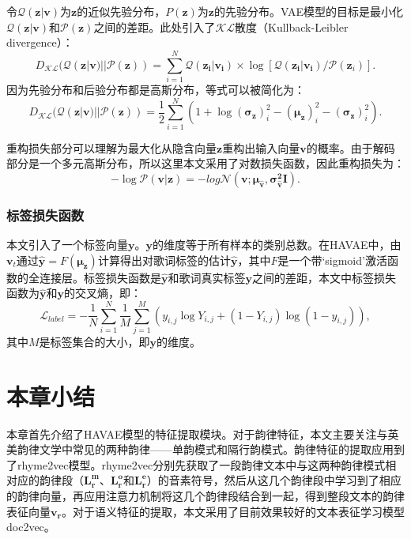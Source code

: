 令$ \mathcal Q( \bm z|\bm v)$为$ \bm z $的近似先验分布，$ P\left(\bm z\right) $为$ \bm z $的先验分布。VAE模型的目标是最小化$\mathcal Q (\bm z|\bm{v})$和$\mathcal P\left(\bm z\right) $之间的差距。此处引入了$\mathcal{KL}$散度（Kullback-Leibler divergence）：
\begin{equation}
    D_{\mathcal{KL}}(\mathcal{Q}(\bm z|\bm v)||\mathcal{P}(\bm z))=\sum _{i=1}^{N}\mathcal{Q}(\bm {z_i}|\bm {v_i}) \times \log { [{\mathcal{Q}(\bm {z_i}|\bm {v_i})}/{\mathcal P\left(\bm z_i\right)}]}.
\end{equation}
因为先验分布和后验分布都是高斯分布，等式可以被简化为：
\begin{equation}
    D_{\mathcal{KL}}(\mathcal{Q}(\bm z|\bm v)||\mathcal{P}(\bm z))=\frac{1}{2}\sum_{i=1}^{N}(1+\log(\bm{\sigma_z})_i^2-(\bm{\mu_z})_i^2-(\bm{\sigma_z})_i^2).
\end{equation}
\par

重构损失部分可以理解为最大化从隐含向量$\bm z$重构出输入向量$\bm v$的概率。由于解码部分是一个多元高斯分布，所以这里本文采用了对数损失函数，因此重构损失为：
\begin{equation}
    -\log\mathcal{P}(\bm v|\bm z)=-log\mathcal{N}(\bm v; \bm{\mu_{\hat{v}}}, \bm{\sigma_{\hat{v}}^2I}).
\end{equation}
\par

\subsubsection{标签损失函数}
本文引入了一个标签向量$\bm y$。$\bm y$的维度等于所有样本的类别总数。在HAVAE中，由$\bm v_t$通过$\bm {\hat{y}} = F(\bm{\mu_z})$计算得出对歌词标签的估计$\bm {\hat{y}}$，其中$F$是一个带‘sigmoid’激活函数的全连接层。标签损失函数是$\bm {\hat y}$和歌词真实标签$\bm y$之间的差距，本文中标签损失函数为$\bm {\hat y}$和$\bm y$的交叉熵，即：
\begin{equation}
  \mathcal{L}_{label}=-\frac{1}{N}{\sum_{i=1}^N}\frac{1}{M}{\sum_{j=1}^{M}}(y_{i,j}{\log {Y}_{i,j} }+(1-Y_{i,j})\log(1-y_{i,j})),
\end{equation}
其中$M$是标签集合的大小，即$\bm y$的维度。
\par

\section{本章小结}
本章首先介绍了HAVAE模型的特征提取模块。对于韵律特征，本文主要关注与英美韵律文学中常见的两种韵律——单韵模式和隔行韵模式。韵律特征的提取应用到了rhyme2vec模型。rhyme2vec分别先获取了一段韵律文本中与这两种韵律模式相对应的韵律段（$\bm {L_r^m}$、$\bm {L_r^o}$和$\bm {L_r^e}$）的音素符号，然后从这几个韵律段中学习到了相应的韵律向量，再应用注意力机制将这几个韵律段结合到一起，得到整段文本的韵律表征向量$\bm {v_r}$。对于语义特征的提取，本文采用了目前效果较好的文本表征学习模型doc2vec。\par

